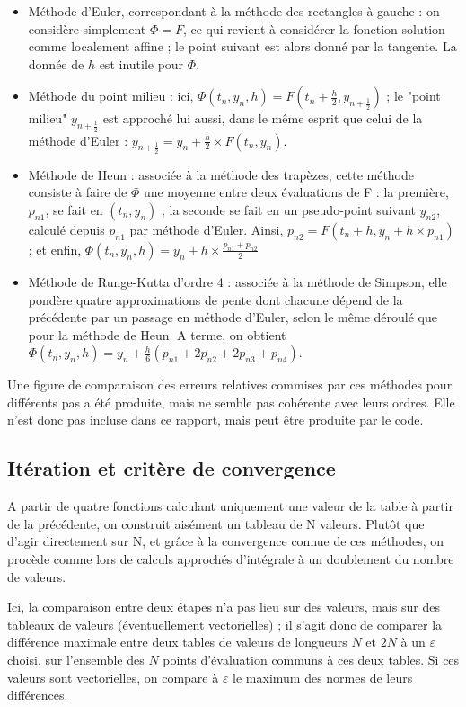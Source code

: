 \documentclass{article}
\begin{document}
\begin{itemize}
    \item Méthode d'Euler, correspondant à la méthode des rectangles à gauche : on considère simplement $\Phi = F$, ce qui revient à considérer la fonction solution comme localement affine ; le point suivant est alors donné par la tangente. La donnée de $h$ est inutile pour $\Phi$.
    \item Méthode du point milieu : ici, $\Phi(t_n,y_n,h) = F(t_n+\frac{h}{2},y_{n+\frac{1}{2}})$ ; le "point milieu" $y_{n+\frac{1}{2}}$ est approché lui aussi, dans le même esprit que celui de la méthode d'Euler : $y_{n+\frac{1}{2}} = y_n + \frac{h}{2} \times F(t_n,y_n)$.
    \item Méthode de Heun : associée à la méthode des trapèzes, cette méthode consiste à faire de $\Phi$ une moyenne entre deux évaluations de F : la première, $p_{n1}$, se fait en $(t_n,y_n)$ ; la seconde se fait en un pseudo-point suivant $y_{n2}$, calculé depuis $p_{n1}$ par méthode d'Euler. Ainsi, $p_{n2} = F(t_n+h,y_n+h \times p_{n1})$ ; et enfin, $\Phi(t_n,y_n,h)=y_n+h \times \frac{p_{n1}+p_{n2}}{2}$
    \item Méthode de Runge-Kutta d'ordre 4 : associée à la méthode de Simpson, elle pondère quatre approximations de pente dont chacune dépend de la précédente par un passage en méthode d'Euler, selon le même déroulé que pour la méthode de Heun. A terme, on obtient $\Phi(t_n,y_n,h)=y_n + \frac{h}{6}(p_{n1}+2p_{n2}+2p_{n3}+p_{n4})$.
\end{itemize}

Une figure de comparaison des erreurs relatives commises par ces méthodes pour différents pas a été produite, mais ne semble pas cohérente avec leurs ordres. Elle n'est donc pas incluse dans ce rapport, mais peut être produite par le code.

\subsection{Itération et critère de convergence}

A partir de quatre fonctions calculant uniquement une valeur de la table à partir de la précédente, on construit aisément un tableau de N valeurs. Plutôt que d'agir directement sur N, et grâce à la convergence connue de ces méthodes, on procède comme lors de calculs approchés d'intégrale à un doublement du nombre de valeurs. 

Ici, la comparaison entre deux étapes n'a pas lieu sur des valeurs, mais sur des tableaux de valeurs (éventuellement vectorielles) ; il s'agit donc de comparer la différence maximale entre deux tables de valeurs de longueurs $N$ et $2N$ à un $\varepsilon$ choisi, sur l'ensemble des $N$ points d'évaluation communs à ces deux tables. Si ces valeurs sont vectorielles, on compare à $\varepsilon$ le maximum des normes de leurs différences.
\end{document}
